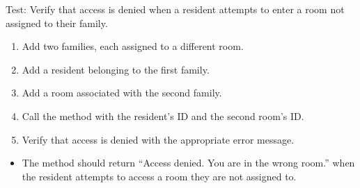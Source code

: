 \documentclass[letterpaper,10pt,english]{sphinxmanual}
\begin{document}
\begin{fulllineitems}
\label{\detokenize{test:test.test_room.test_access_room_wrong_room}}
\pysigstartsignatures
\pysiglinewithargsret
{}
{}
{}
\pysigstopsignatures
\sphinxAtStartPar
Test: Verify that access is denied when a resident attempts to enter a room not assigned to their family.
\begin{description}
\begin{enumerate}
%
\item {} 
\sphinxAtStartPar
Add two families, each assigned to a different room.

\item {} 
\sphinxAtStartPar
Add a resident belonging to the first family.

\item {} 
\sphinxAtStartPar
Add a room associated with the second family.

\item {} 
\sphinxAtStartPar
Call the  method with the resident’s ID and the second room’s ID.

\item {} 
\sphinxAtStartPar
Verify that access is denied with the appropriate error message.

\end{enumerate}

\begin{itemize}
\item {} 
\sphinxAtStartPar
The method should return “Access denied. You are in the wrong room.”
when the resident attempts to access a room they are not assigned to.

\end{itemize}

\end{description}

\end{fulllineitems}

\end{document}
